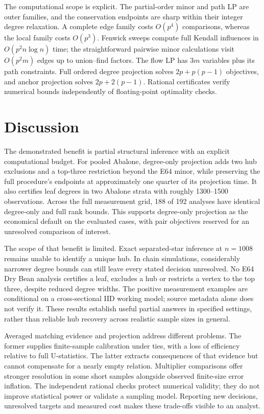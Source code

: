 \documentclass[11pt]{article}
\theoremstyle{plain}
\theoremstyle{definition}\newtheorem{remark}{Remark}\newtheorem{example}{Example}
\begin{document}


The computational scope is explicit. The partial-order minor and path LP are outer families, and the conservation endpoints are sharp within their integer degree relaxation. A complete edge family costs $O(p^4)$ comparisons, whereas the local family costs $O(p^3)$. Fenwick sweeps compute full Kendall influences in $O(p^2n\log n)$ time; the straightforward pairwise minor calculations visit $O(p^2m)$ edges up to union--find factors. The flow LP has $3m$ variables plus its path constraints. Full ordered degree projection solves $2p+p(p-1)$ objectives, and anchor projection solves $2p+2(p-1)$. Rational certificates verify numerical bounds independently of floating-point optimality checks.

\section{Discussion}
The demonstrated benefit is partial structural inference with an explicit computational budget. For pooled Abalone, degree-only projection adds two hub exclusions and a top-three restriction beyond the E64 minor, while preserving the full procedure's endpoints at approximately one quarter of its projection time. It also certifies leaf degrees in two Abalone strata with roughly 1300--1500 observations. Across the full measurement grid, 188 of 192 analyses have identical degree-only and full rank bounds. This supports degree-only projection as the economical default on the evaluated cases, with pair objectives reserved for an unresolved comparison of interest.

The scope of that benefit is limited. Exact separated-star inference at $n=1008$ remains unable to identify a unique hub. In chain simulations, considerably narrower degree bounds can still leave every stated decision unresolved. No E64 Dry Bean analysis certifies a leaf, excludes a hub or restricts a vertex to the top three, despite reduced degree widths. The positive measurement examples are conditional on a cross-sectional IID working model; source metadata alone does not verify it. These results establish useful partial answers in specified settings, rather than reliable hub recovery across realistic sample sizes in general.

Averaged matching evidence and projection address different problems. The former supplies finite-sample calibration under ties, with a loss of efficiency relative to full U-statistics. The latter extracts consequences of that evidence but cannot compensate for a nearly empty relation. Multiplier comparisons offer stronger resolution in some short samples alongside observed finite-size error inflation. The independent rational checks protect numerical validity; they do not improve statistical power or validate a sampling model. Reporting new decisions, unresolved targets and measured cost makes these trade-offs visible to an analyst.
\end{document}
